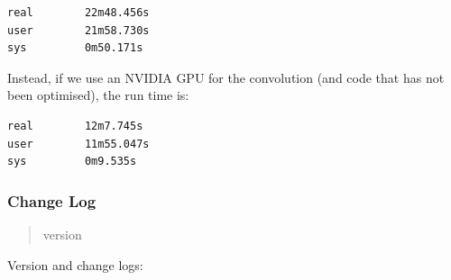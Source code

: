 \documentclass[a4paper,11pt,english]{sphinxmanual}
\begin{document}
\begin{Verbatim}[commandchars=\\\{\}]
real        22m48.456s
user        21m58.730s
sys         0m50.171s
\end{Verbatim}

Instead, if we use an NVIDIA GPU for the convolution (and code that has not been optimised), the run time is:

\begin{Verbatim}[commandchars=\\\{\}]
real        12m7.745s
user        11m55.047s
sys         0m9.535s
\end{Verbatim}


\subsubsection{Change Log}
\label{simulator:change-log}\begin{quote}\begin{description}
\item[{version}] 

\end{description}\end{quote}

Version and change logs:
\end{document}
